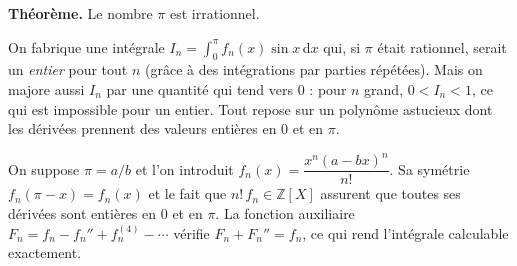 \decsep{}


\begin{tcolorbox}[thmbox]
  \textbf{Théorème.}\enspace%
  Le nombre $\pi$ est irrationnel.
\end{tcolorbox}

\begin{significationintuitive}
On fabrique une intégrale $I_n = \int_0^\pi f_n(x)\sin x\,\mathrm{d}x$ qui, si
$\pi$ était rationnel, serait un \emph{entier} pour tout $n$ (grâce à des
intégrations par parties répétées). Mais on majore aussi $I_n$ par une quantité
qui tend vers $0$ : pour $n$ grand, $0 < I_n < 1$, ce qui est impossible pour un
entier. Tout repose sur un polynôme astucieux dont les dérivées prennent des
valeurs entières en $0$ et en $\pi$.
\end{significationintuitive}

\begin{ideepreuve}
On suppose $\pi = a/b$ et l'on introduit $f_n(x) = \dfrac{x^n (a-bx)^n}{n!}$.
Sa symétrie $f_n(\pi - x) = f_n(x)$ et le fait que $n!\,f_n \in \mathbb{Z}[X]$
assurent que toutes ses dérivées sont entières en $0$ et en $\pi$. La fonction
auxiliaire $F_n = f_n - f_n'' + f_n^{(4)} - \cdots$ vérifie $F_n + F_n'' = f_n$,
ce qui rend l'intégrale calculable exactement.
\end{ideepreuve}


